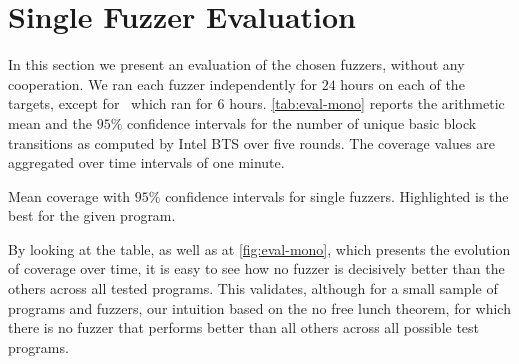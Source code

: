\section{Single Fuzzer Evaluation}
\label{sec:eval-mono}

In this section we present an evaluation of the chosen fuzzers, without any
cooperation. We ran each fuzzer independently for $24$ hours on each of the
targets, except for \listswf\ which ran for $6$ hours. \autoref{tab:eval-mono}
reports the arithmetic mean and the $95\%$ confidence intervals for the number
of unique basic block transitions as computed by Intel \ac{BTS} over five
rounds. The coverage values are aggregated over time intervals of one minute.

\begin{table}[h]
    \centering%
    \small%
    \begin{adjustbox}{tabular=l*{4}c,center}
        
    \end{adjustbox}
    \caption{Mean coverage with $95\%$ confidence intervals for single fuzzers.
    Highlighted is the best for the given program.}
    \label{tab:eval-mono}
\end{table}

By looking at the table, as well as at \autoref{fig:eval-mono}, which presents
the evolution of coverage over time, it is easy to see how no fuzzer is
decisively better than the others across all tested programs. This validates,
although for a small sample of programs and fuzzers, our intuition based on the
no free lunch theorem, for which there is no fuzzer that performs better than
all others across all possible test programs.

